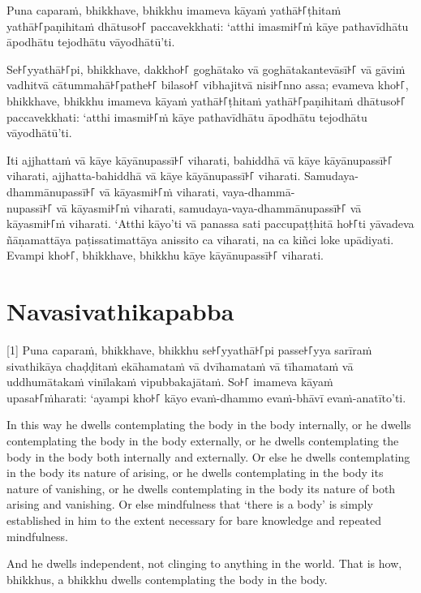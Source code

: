 Puna caparaṁ, bhikkhave, bhikkhu imameva kāyaṁ yathā꜔꜒ṭhitaṁ yathā꜔꜒paṇihitaṁ
dhātuso꜔꜒ paccavekkhati: ‘atthi imasmi꜔꜒ṁ kāye pathavīdhātu āpodhātu tejodhātu
vāyodhātū’ti.

Se꜔꜒yyathā꜔꜒pi, bhikkhave, dakkho꜔꜒ goghātako vā goghātakantevāsī꜔꜒ vā gāviṁ vadhitvā
cātummahā꜔꜒pathe꜔꜒ bilaso꜔꜒ vibhajitvā nisi꜔꜒nno assa; evameva kho꜔꜒, bhikkhave, bhikkhu
imameva kāyaṁ yathā꜔꜒ṭhitaṁ yathā꜔꜒paṇihitaṁ dhātuso꜔꜒ paccavekkhati: ‘atthi imasmi꜔꜒ṁ
kāye pathavīdhātu āpodhātu tejodhātu vāyodhātū’ti.

Iti ajjhattaṁ vā kāye kāyānupassī꜔꜒ viharati, bahiddhā vā kāye kāyānupassī꜔꜒
viharati, ajjhatta-bahiddhā vā kāye kāyānupassī꜔꜒ viharati. Samudaya-dhammānupassī꜔꜒
vā kāyasmi꜔꜒ṁ viharati, vaya-dhammā-\\
nupassī꜔꜒ vā kāyasmi꜔꜒ṁ viharati, samudaya-vaya-dhammānupassī꜔꜒ vā kāyasmi꜔꜒ṁ viharati.
‘Atthi kāyo’ti vā panassa sati paccupaṭṭhitā ho꜔꜒ti yāvadeva ñāṇamattāya
paṭissatimattāya anissito ca viharati, na ca kiñci loke upādiyati. Evampi kho꜔꜒,
bhikkhave, bhikkhu kāye kāyānupassī꜔꜒ viharati.


\section*{Navasivathikapabba}

[1] Puna caparaṁ, bhikkhave, bhikkhu se꜔꜒yyathā꜔꜒pi passe꜔꜒yya sarīraṁ sivathikāya
chaḍḍitaṁ ekāhamataṁ vā dvīhamataṁ vā tīhamataṁ vā uddhumātakaṁ vinīlakaṁ
vipubbakajātaṁ. So꜔꜒ imameva kāyaṁ upasa꜔꜒ṁharati: ‘ayampi kho꜔꜒ kāyo evaṁ-dhammo
evaṁ-bhāvī evaṁ-anatīto’ti.

\englishPage

In this way he dwells contemplating the body in the body internally, or he
dwells contemplating the body in the body externally, or he dwells contemplating
the body in the body both internally and externally. Or else he dwells
contemplating in the body its nature of arising, or he dwells contemplating in
the body its nature of vanishing, or he dwells contemplating in the body its
nature of both arising and vanishing. Or else mindfulness that ‘there is a body’
is simply established in him to the extent necessary for bare knowledge and
repeated mindfulness.

And he dwells independent, not clinging to anything in the world. That is how,
bhikkhus, a bhikkhu dwells contemplating the body in the body.

